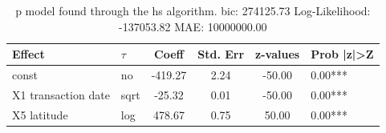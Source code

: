 \begin{table}
	\caption{p model found through the hs algorithm. bic: 274125.73 Log-Likelihood: -137053.82 MAE: 10000000.00}
	\begin{center}
		\begin{tabular}{|l|l|c|c|c|l|}
			\hline
			Effect & $\tau$ & Coeff & Std. Err & z-values & Prob |z|>Z \\
			\hline
			const & no & -419.27 & 2.24 & -50.00 & 0.00*** \\
			\hline
			X1 transaction date & sqrt & -25.32 & 0.01 & -50.00 & 0.00*** \\
			\hline
			X5 latitude & log & 478.67 & 0.75 & 50.00 & 0.00*** \\
			\hline
		\end{tabular}
	\end{center}
\end{table}